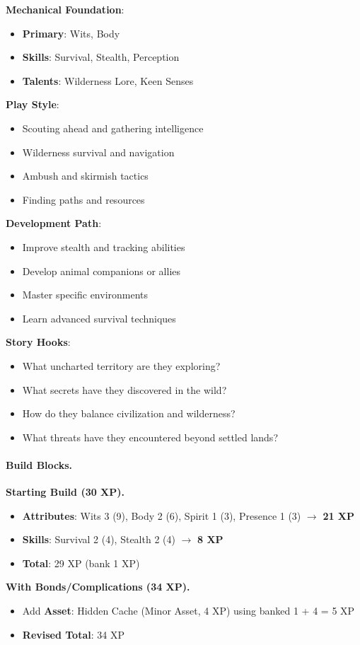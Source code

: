 \textbf{Mechanical Foundation}:
\begin{itemize}
\item \textbf{Primary}: Wits, Body
\item \textbf{Skills}: Survival, Stealth, Perception
\item \textbf{Talents}: Wilderness Lore, Keen Senses
\end{itemize}

\textbf{Play Style}:
\begin{itemize}
\item Scouting ahead and gathering intelligence
\item Wilderness survival and navigation
\item Ambush and skirmish tactics
\item Finding paths and resources
\end{itemize}

\textbf{Development Path}:
\begin{itemize}
\item Improve stealth and tracking abilities
\item Develop animal companions or allies
\item Master specific environments
\item Learn advanced survival techniques
\end{itemize}

\textbf{Story Hooks}:
\begin{itemize}
\item What uncharted territory are they exploring?
\item What secrets have they discovered in the wild?
\item How do they balance civilization and wilderness?
\item What threats have they encountered beyond settled lands?
\end{itemize}

\paragraph{Build Blocks.}
\textbf{Starting Build (30 XP).}
\begin{itemize}
\item \textbf{Attributes}: Wits 3 (9), Body 2 (6), Spirit 1 (3), Presence 1 (3) $\rightarrow$ \textbf{21 XP}
\item \textbf{Skills}: Survival 2 (4), Stealth 2 (4) $\rightarrow$ \textbf{8 XP}
\item \textbf{Total}: 29 XP (bank 1 XP)
\end{itemize}
\textbf{With Bonds/Complications (34 XP).}
\begin{itemize}
\item Add \textbf{Asset}: Hidden Cache (Minor Asset, 4 XP) using banked 1 + 4 = 5 XP
\item \textbf{Revised Total}: 34 XP
\end{itemize}

